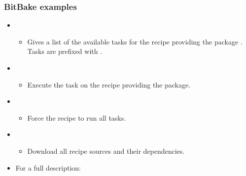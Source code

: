 \begin{frame}
  \frametitle{BitBake examples}
  \begin{itemize}
    \item {}
    \begin{itemize}
      \item Gives a list of the available tasks for the recipe
        providing the package . Tasks are
        prefixed with .
    \end{itemize}
    \item {}
    \begin{itemize}
      \item Execute the task  on the recipe providing
        the  package.
    \end{itemize}
    \item {}
    \begin{itemize}
      \item Force the  recipe to run all tasks.
    \end{itemize}
    \item {}
    \begin{itemize}
      \item Download all recipe sources and their dependencies.
    \end{itemize}
    \item For a full description: 
  \end{itemize}
\end{frame}

